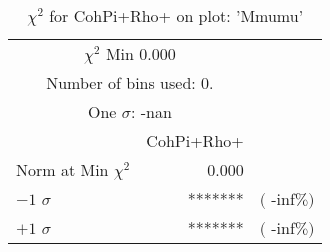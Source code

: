  \begin{table}[h!]\centering
 {\small{
 \begin{tabular}{||l||r||r||}
 \hline
 \hline
\multicolumn{2}{||c||}{$\chi^{2}$ Min   0.000} & \\
 \multicolumn{2}{||c||}{Number of bins used:   0.} & \\
\multicolumn{2}{||c||}{One $\sigma$:     -nan} & \\
 \hline
 \hline
    & CohPi+Rho+ & \\
Norm at Min $\chi^{2}$  &   0.000 & \\
$-1$ $\sigma$ & *******  &  $($ -inf$\%)$  \\
$+1$ $\sigma$ & *******  &  $($ -inf$\%)$  \\
 \hline
 \hline
 \end{tabular}
 \caption{$\chi^{2}$ for CohPi+Rho+ on plot: 'Mmumu'}
 \label{tab-chicohpip}
 }}
 \end{table}
 \endinput
